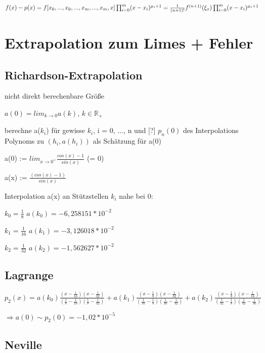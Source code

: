 \documentclass[12pt,a4paper]{article} %
\newcommand*\tab[1][1cm]{\hspace*{#1}}
\begin{document}
	$f(x) - p(x) = f[x_0, ..., x_0, ..., x_m, ..., x_m, x]\prod_{i = 0}^{m}(x - x_i)^{\mu_i + 1} \\
	 = \frac{1}{(n + 1)!}f^{(n + 1)}(\xi_x)\prod_{i = 0}^{m}(x - x_i)^{\mu_i + 1}$
	
	\newpage
	
	\section[Extrapolation]{Extrapolation zum Limes + Fehler}
	
	\subsection{Richardson-Extrapolation}
	
	nicht direkt berechenbare Größe
	
	$a(0) = lim_{k\rightarrow 0}a(k)$, \tab $k \in \mathbb{R}_+$
	
	berechne a($k_i$) für gewisse $k_i$, i = 0, ..., n und [?] $p_n(0)$ des Interpolations Polynoms zu $(h_i, a(h_i))$ als Schätzung für a(0)
	
	a(0) := $lim_{x\rightarrow 0^+}\frac{cos(x) - 1}{sin(x)}$ \tab (= 0)
	
	a(x) := $\frac{(cos(x) - 1)}{sin(x)}$
	
	Interpolation a(x) an Stützstellen $k_i$ nahe bei 0:
	
	$k_0 = \frac{1}{8}$ \tab $a(k_0) = -6,258151 * 10^{-2}$
	
	$k_1 = \frac{1}{16}$ \tab $a(k_1) = -3,126018 * 10^{-2}$
	
	$k_2 = \frac{1}{32}$ \tab $a(k_2) = -1,562627 * 10^{-2}$
	
	\subsection{Lagrange}
	
	$p_2(x) = a(k_0) \frac{(x - \frac{1}{16})(x - \frac{1}{32})}{(\frac{1}{8} - \frac{1}{16})(\frac{1}{8} - \frac{1}{32})} + a(k_1)\frac{(x - \frac{1}{8})(x - \frac{1}{32})}{(\frac{1}{16} - \frac{1}{8})(\frac{1}{16} - \frac{1}{32})} + a(k_2) \frac{(x - \frac{1}{8})(x - \frac{1}{16})}{(\frac{1}{32} - \frac{1}{8})(\frac{1}{32} - \frac{1}{16})}$
	
	$\Rightarrow a(0) \sim p_2(0) = -1,02 * 10^{-5}$
	
	\subsection{Neville}
	
\end{document}
